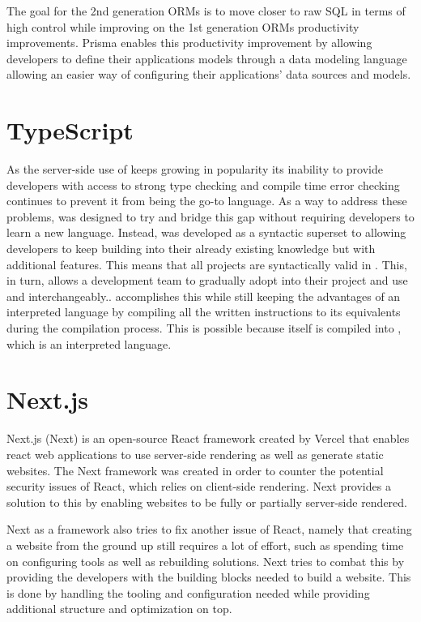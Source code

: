 The goal for the 2nd generation ORMs is to move closer to raw SQL in terms of high control while improving on the 1st generation ORMs productivity improvements. 
Prisma enables this productivity improvement by allowing developers to define their applications models through a data modeling language allowing an easier way of configuring their applications' data sources and models\cite{Prisma_Doc}.

\section*{TypeScript}
As the server-side use of \javascript{} keeps growing in popularity its inability to provide developers with access to strong type checking and compile time error checking continues to prevent it from being the go-to language.
As a way to address these problems, \typescript{} was designed to try and bridge this gap without requiring developers to learn a new language.
Instead, \typescript{} was developed as a syntactic superset to \javascript{} allowing developers to keep building into their already existing knowledge but with additional features. 
This means that all \javascript{} projects are syntactically valid in \typescript{}. This, in turn, allows a development team to gradually adopt \typescript{} into their project and use \typescript{} and \javascript{} interchangeably.\cite{TypeScript}. 
\typescript{} accomplishes this while still keeping the advantages of an interpreted language by compiling all the written instructions to its \javascript{} equivalents during the compilation process. 
This is possible because \typescript{} itself is compiled into \javascript{}, which is an interpreted language. 

\section*{Next.js}
Next.js (Next) is an open-source React framework created by Vercel that enables react web applications to use server-side rendering as well as generate static websites. The Next framework was created in order to counter the potential security issues of React, which relies on client-side rendering. Next provides a solution to this by enabling websites to be fully or partially server-side rendered\cite {Nextjs_Docks}. 

Next as a framework also tries to fix another issue of React, namely that creating a website from the ground up still requires a lot of effort, such as spending time on configuring tools as well as rebuilding solutions. 
Next tries to combat this by providing the developers with the building blocks needed to build a website.
This is done by handling the tooling and configuration needed while providing additional structure and optimization on top\cite{Nextjs_Docks}.


